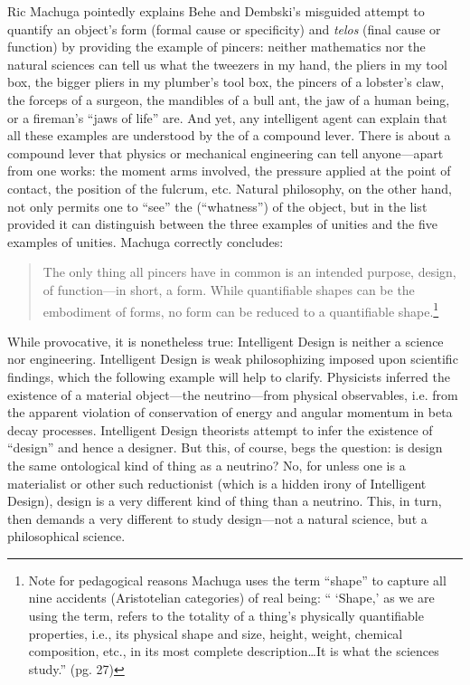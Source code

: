 Ric Machuga pointedly explains Behe and Dembski's misguided attempt to quantify an object's form (formal cause or specificity) and \textit{telos} (final cause or function) by providing the example of pincers: neither mathematics nor the natural sciences can tell us what the tweezers in my hand, the pliers in my tool box, the bigger pliers in my plumber's tool box, the pincers of a lobster's claw, the forceps of a surgeon, the mandibles of a bull ant, the jaw of a human being, or a fireman's ``jaws of life'' are. And yet, any intelligent agent can explain that all these examples are understood by the  of a compound lever. There is  about  a compound lever  that physics or mechanical engineering can tell anyone---apart from  one works: the moment arms involved, the pressure applied at the point of contact, the position of the fulcrum, etc. Natural philosophy, on the other hand, not only permits one to ``see'' the  (``whatness'') of the object, but in the list provided it can distinguish between the three examples of  unities and the five examples of  unities. Machuga correctly concludes:

\begin{quote}
The only thing all pincers have in common is an intended purpose, design, of function---in short, a form. While quantifiable shapes can be the embodiment of forms, no form can be reduced to a quantifiable shape.\cite[pg.~162]{machuga}\footnote{Note for pedagogical reasons Machuga uses the term ``shape'' to capture all nine accidents (Aristotelian categories) of real being: `` `Shape,' as we are using the term, refers to the totality of a thing's physically quantifiable properties, i.e., its physical shape and size, height, weight, chemical composition, etc., in its most complete description\ldots It is what the sciences study.'' (pg. 27)}
\end{quote}

While provocative, it is nonetheless true: Intelligent Design is neither a science nor engineering. Intelligent Design is weak philosophizing imposed upon scientific findings, which the following example will help to clarify. Physicists inferred the existence of a material object---the neutrino---from physical observables, i.e. from the apparent violation of conservation of energy and angular momentum in beta decay processes. Intelligent Design theorists attempt to infer the existence of ``design'' and hence a designer. But this, of course, begs the question: is design the same ontological kind of thing as a neutrino? No, for unless one is a materialist or other such reductionist (which is a hidden irony of Intelligent Design), design is a very different kind of thing than a neutrino.  This, in turn, then demands a very different  to study design---not a natural science, but a philosophical science.

